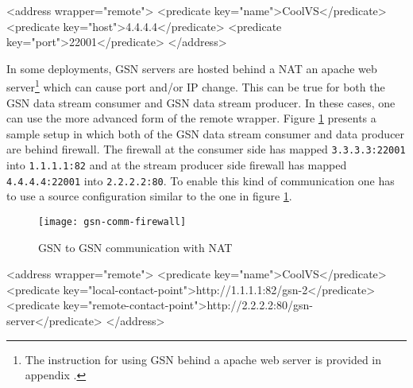 \begin{xmlcode}[caption={Source configuration for simple GSN to GSN communication.}, label=gsn2gsn-simple]
<address wrapper="remote">
  <predicate key="name">CoolVS</predicate>
  <predicate key="host">4.4.4.4</predicate>
  <predicate key="port">22001</predicate>
</address>        
\end{xmlcode}

In some deployments, GSN servers are hosted behind a NAT an apache web server\footnote{The instruction for using GSN behind a apache web server is provided in appendix .} which can cause port and/or IP change. This can be true for both the GSN data stream consumer and GSN data stream producer.
In these cases, one can use the more advanced form of the remote wrapper. Figure \ref{gsn2gsn-nat-figure} presents a sample setup in which both of the GSN data stream
consumer and data producer are behind firewall. The firewall at the consumer side has mapped \texttt{3.3.3.3:22001} into \texttt{1.1.1.1:82} and at the stream producer side
firewall has mapped \texttt{4.4.4.4:22001} into \texttt{2.2.2.2:80}.  To enable this kind of
communication one has to use a source configuration similar to the one in figure \ref{gsn2gsn-nat-figure}.


\begin{figure}%
  \centering
  \texttt{[image: gsn-comm-firewall]}
  \caption{GSN to GSN communication with NAT}
  \label{gsn2gsn-nat-figure}
\end{figure}

\begin{xmlcode}[caption={Source configuration for NATed GSN to GSN communication.}, label=listing:xml:nat_remote_vsd]
<address wrapper="remote">
  <predicate key="name">CoolVS</predicate>
  <predicate key="local-contact-point">http://1.1.1.1:82/gsn-2</predicate>
  <predicate key="remote-contact-point">http://2.2.2.2:80/gsn-server</predicate>
</address>        
\end{xmlcode}

